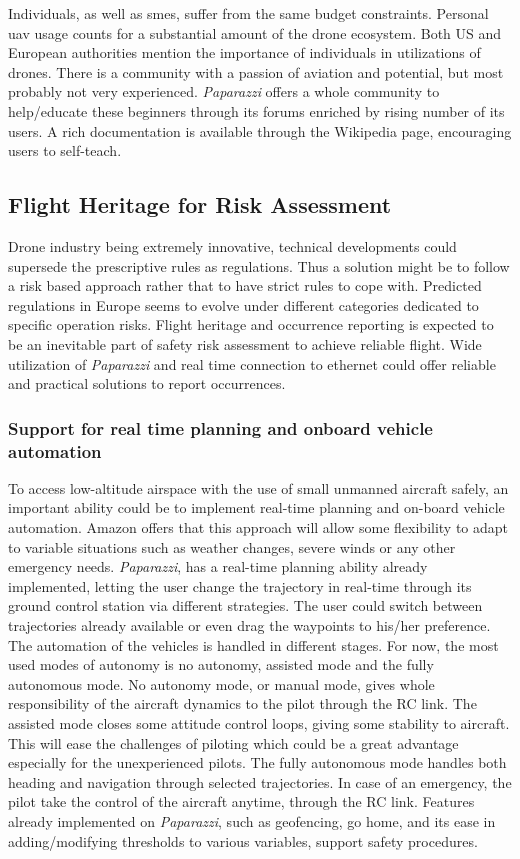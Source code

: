 Individuals, as well as \gls{sme}s, suffer from the same budget constraints. Personal \gls{uav} usage counts for a substantial amount of the drone ecosystem.  Both US and European authorities mention the importance of individuals in utilizations of drones. There is a community with a passion of aviation and potential, but most probably not very experienced. \emph{Paparazzi} offers a whole community to help/educate these beginners through its forums enriched by rising number of its users.  A rich documentation is available through the Wikipedia page, encouraging users to self-teach.  

\subsection{Flight Heritage for Risk Assessment}

Drone industry being extremely innovative, technical developments could supersede the prescriptive rules as regulations. Thus a solution might be to follow a risk based approach rather that to have strict rules to cope with. Predicted regulations in Europe seems to evolve under different categories dedicated to specific operation risks. Flight heritage and occurrence reporting is expected to be an inevitable part of safety risk assessment to achieve reliable flight. Wide utilization of \emph{Paparazzi} and real time connection to ethernet could offer reliable and practical solutions to report occurrences.  

\subsubsection{Support for real time planning and onboard vehicle automation}
To access low-altitude airspace with the use of small unmanned aircraft safely, an important ability could be to implement real-time planning and on-board vehicle automation. Amazon offers that this approach will allow some flexibility to adapt to variable situations such as weather changes, severe winds or any other emergency needs. \emph{Paparazzi}, has a real-time planning ability already implemented, letting the user change the trajectory in real-time through its ground control station via different strategies. The user could switch between trajectories already available or even drag the waypoints to his/her preference. The automation of the vehicles is handled in different stages. For now, the most used modes of autonomy is no autonomy, assisted mode and the fully autonomous mode. No autonomy mode, or manual mode, gives whole responsibility of the aircraft dynamics to the pilot through the RC link.  The assisted mode closes some attitude control loops, giving some stability to aircraft. This will ease the challenges of piloting which could be a great advantage especially for the unexperienced pilots. The fully autonomous mode handles both heading and navigation through selected trajectories. In case of an emergency, the pilot take the control of the aircraft anytime, through the RC link. Features already implemented on \emph{Paparazzi}, such as geofencing, go home, and its ease in adding/modifying thresholds to various variables, support safety procedures.

